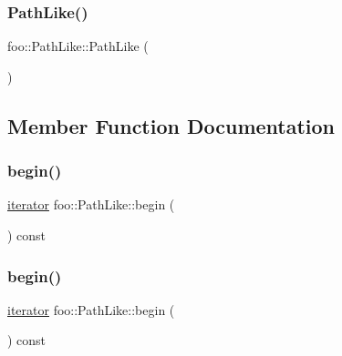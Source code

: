 \mbox{\label{classfoo_1_1_path_like_a1fa696ea0514127f1a57cecd28bd08dc}} 
\subsubsection{\texorpdfstring{PathLike()}{PathLike()}\hspace{0.1cm}{\footnotesize\ttfamily [3/3]}}
{\footnotesize\ttfamily foo\+::\+Path\+Like\+::\+Path\+Like (\begin{DoxyParamCaption}{ }\end{DoxyParamCaption})\hspace{0.3cm}{\ttfamily [inline]}}



\subsection{Member Function Documentation}
\mbox{\label{classfoo_1_1_path_like_a7ca8b63139fd6fcada55fbf13ccf9c83}} 
\subsubsection{\texorpdfstring{begin()}{begin()}\hspace{0.1cm}{\footnotesize\ttfamily [1/3]}}
{\footnotesize\ttfamily \mbox{\hyperlink{structfoo_1_1_path_like_1_1iterator}{iterator}} foo\+::\+Path\+Like\+::begin (\begin{DoxyParamCaption}{ }\end{DoxyParamCaption}) const\hspace{0.3cm}{\ttfamily [inline]}}

\mbox{\label{classfoo_1_1_path_like_a7ca8b63139fd6fcada55fbf13ccf9c83}} 
\subsubsection{\texorpdfstring{begin()}{begin()}\hspace{0.1cm}{\footnotesize\ttfamily [2/3]}}
{\footnotesize\ttfamily \mbox{\hyperlink{structfoo_1_1_path_like_1_1iterator}{iterator}} foo\+::\+Path\+Like\+::begin (\begin{DoxyParamCaption}{ }\end{DoxyParamCaption}) const\hspace{0.3cm}{\ttfamily [inline]}}

